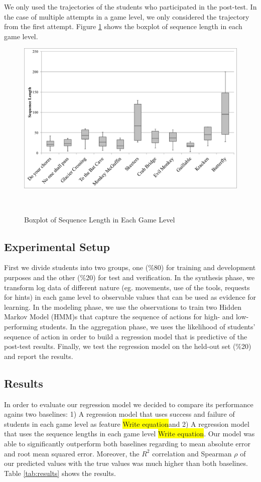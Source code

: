 \documentclass{sigchi}
\newcommand{\hl}[1]{\colorbox{yellow}{#1}}
\begin{document}
We only used the trajectories of the students who participated in the post-test.
In the case of multiple attempts in a game level, we only considered the trajectory from the first attempt.
Figure \ref{fig:boxplot} shows the boxplot of sequence length in each game level.

\begin{figure}[b]
	\centering
	\includegraphics[width=0.9\columnwidth]{figures/boxplot}
	\caption{Boxplot of Sequence Length in Each Game Level}~\label{fig:boxplot}
\end{figure}

\subsection{Experimental Setup}
First we divide students into two groups, one (\%80) for training and development purposes and the other (\%20) for test and verification.
In the synthesis phase, we transform log data of different nature (eg. movements, use of the tools, requests for hints) in each game level to observable values that can be used as evidence for learning.
In the modeling phase, we use the observations to train two Hidden Markov Model (HMM)s that capture the sequence of actions for high- and low-performing students.
In the aggregation phase, we uses the likelihood of students' sequence of action in order to build a regression model that is predictive of the post-test results.
Finally, we test the regression model on the held-out set (\%20) and report the results.


\subsection{Results}
In order to evaluate our regression model we decided to compare its performance agains two baselines: 1) A regression model that uses success and failure of students in each game level as feature \hl{Write equation}and 2) A regression model that uses the sequence lengths in each game level \hl{Write equation}. 
Our model was able to significantly outperform both baselines regarding to mean absolute error and root mean squared error. 
Moreover, the $R^2$ correlation and Spearman $\rho$ of our predicted values with the true values was much higher than both baselines. Table \ref{tab:results} shows the results.
\end{document}
